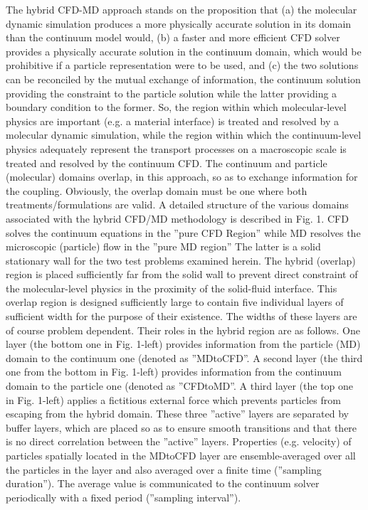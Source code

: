 \documentclass[preprint,12pt]{elsarticle}
\newcommand{\Nkimnote}[1]{ {\textcolor{blue} { ***NKim: #1 }}}
\newcommand{\Nkimnote}[1]{}
\begin{document}
The hybrid CFD-MD approach stands on the proposition that (a) the molecular dynamic simulation produces a more physically accurate solution in its domain than the continuum model would, (b) a faster and more efficient CFD solver provides a physically accurate solution in the continuum domain, which would be prohibitive if a particle representation were to be used, and (c) the two solutions can be reconciled by the mutual exchange of information, the continuum solution providing the constraint to the particle solution while the latter providing a boundary condition to the former. So, the region within which molecular-level physics are important (e.g. a material interface) is treated and resolved by a molecular dynamic simulation, while the region within which the continuum-level physics adequately represent the transport processes on a macroscopic scale is treated and resolved by the continuum CFD. The continuum and particle (molecular) domains overlap, in this approach, so as to exchange information for the coupling. Obviously, the overlap domain must be one where both treatments/formulations are valid.
A detailed structure of the various domains associated with the hybrid CFD/MD methodology is described in Fig. 1. CFD solves the continuum equations in the ''pure CFD Region'' while MD resolves the microscopic (particle) flow in the ''pure MD region'' The latter is a solid stationary wall for the two test problems examined herein. The hybrid (overlap) region is placed sufficiently far from the solid wall to prevent direct constraint of the molecular-level physics in the proximity of the solid-fluid interface. 
This overlap region is designed sufficiently large to contain five individual layers of sufficient width for the purpose of their existence. The widths of these layers are of course problem dependent. Their roles in the hybrid region are as follows. One layer (the bottom one in Fig. 1-left) provides information from the particle (MD) domain to the continuum one (denoted as ''MDtoCFD''. A second layer (the third one from the bottom in Fig. 1-left) provides information from the continuum domain to the particle one (denoted as ''CFDtoMD''. A third layer (the top one in Fig. 1-left) applies a fictitious external force which prevents particles from escaping from the hybrid domain. These three ''active'' layers are separated by buffer layers, which are placed so as to ensure smooth transitions and that there is no direct correlation between the ''active'' layers. Properties (e.g. velocity) of particles spatially located in the MDtoCFD layer are ensemble-averaged over all the particles in the layer and also averaged over a finite time (''sampling duration''). The average value is communicated to the continuum solver periodically with a fixed period (''sampling interval'').
\end{document}
